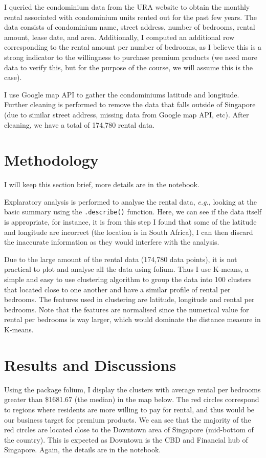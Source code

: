 \documentclass[oneside,11pt]{article}
\newcommand{\eg}{\textit{e.g.}, }
\begin{document}
I queried the condominium data from the URA website to obtain the monthly rental associated with condominium units rented out for the past few years. The data consists of condominium name, street address, number of bedrooms, rental amount, lease date, and area. Additionally, I computed an additional row corresponding to the rental amount per number of bedrooms, as I believe this is a strong indicator to the willingness to purchase premium products (we need more data to verify this, but for the purpose of the course, we will assume this is the case).

I use Google map API to gather the condominiums latitude and longitude. Further cleaning is performed to remove the data that falls outside of Singapore (due to similar street address, missing data from Google map API, etc). After cleaning, we have a total of 174,780 rental data.


\section{Methodology}

I will keep this section brief, more details are in the notebook.

Explaratory analysis is performed to analyse the rental data, \eg
looking at the basic summary using the \texttt{.describe()} function.
Here, we can see if the data itself is appropriate, for instance, 
it is from this step I found that some of the latitude and longitude 
are incorrect (the location is in South Africa), I can then discard 
the inaccurate information as they would interfere with the analysis.

Due to the large amount of the rental data (174,780 data points), 
it is not practical to 
plot and analyse all the data using folium. Thus I use K-means, a
simple and easy to use clustering algorithm to group the data into
100 clusters that located close to one another and have a similar 
profile of rental per bedrooms. The features used in clustering are 
latitude, longitude and rental per bedrooms. Note that the features
are normalised since the numerical value for rental per bedrooms
is way larger, which would dominate the distance measure in K-means.

\section{Results and Discussions}

Using the package folium, I display the clusters with average rental 
per bedrooms greater than \$1681.67 (the median) in the map below.
The red circles correspond to regions where residents are more willing to 
pay for rental, and thus would be our business target for premium
products. We can see that the majority of the red circles are located
close to the Downtown area of Singapore (mid-bottom of the country).
This is expected as Downtown is the CBD and Financial hub of Singapore.
Again, the details are in the notebook.
\end{document}
